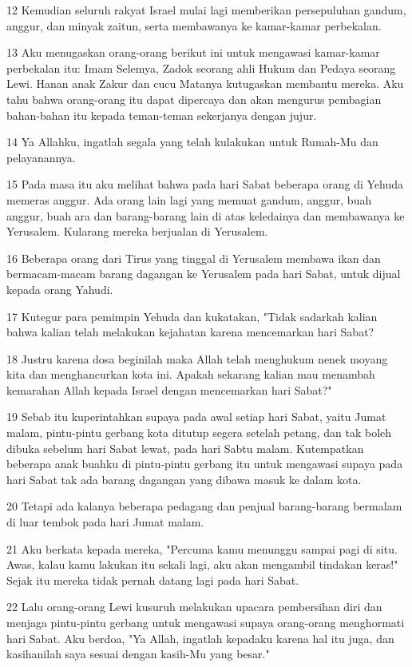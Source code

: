 \par 12 Kemudian seluruh rakyat Israel mulai lagi memberikan persepuluhan gandum, anggur, dan minyak zaitun, serta membawanya ke kamar-kamar perbekalan.
\par 13 Aku menugaskan orang-orang berikut ini untuk mengawasi kamar-kamar perbekalan itu: Imam Selemya, Zadok seorang ahli Hukum dan Pedaya seorang Lewi. Hanan anak Zakur dan cucu Matanya kutugaskan membantu mereka. Aku tahu bahwa orang-orang itu dapat dipercaya dan akan mengurus pembagian bahan-bahan itu kepada teman-teman sekerjanya dengan jujur.
\par 14 Ya Allahku, ingatlah segala yang telah kulakukan untuk Rumah-Mu dan pelayanannya.
\par 15 Pada masa itu aku melihat bahwa pada hari Sabat beberapa orang di Yehuda memeras anggur. Ada orang lain lagi yang memuat gandum, anggur, buah anggur, buah ara dan barang-barang lain di atas keledainya dan membawanya ke Yerusalem. Kularang mereka berjualan di Yerusalem.
\par 16 Beberapa orang dari Tirus yang tinggal di Yerusalem membawa ikan dan bermacam-macam barang dagangan ke Yerusalem pada hari Sabat, untuk dijual kepada orang Yahudi.
\par 17 Kutegur para pemimpin Yehuda dan kukatakan, "Tidak sadarkah kalian bahwa kalian telah melakukan kejahatan karena mencemarkan hari Sabat?
\par 18 Justru karena dosa beginilah maka Allah telah menghukum nenek moyang kita dan menghancurkan kota ini. Apakah sekarang kalian mau menambah kemarahan Allah kepada Israel dengan mencemarkan hari Sabat?"
\par 19 Sebab itu kuperintahkan supaya pada awal setiap hari Sabat, yaitu Jumat malam, pintu-pintu gerbang kota ditutup segera setelah petang, dan tak boleh dibuka sebelum hari Sabat lewat, pada hari Sabtu malam. Kutempatkan beberapa anak buahku di pintu-pintu gerbang itu untuk mengawasi supaya pada hari Sabat tak ada barang dagangan yang dibawa masuk ke dalam kota.
\par 20 Tetapi ada kalanya beberapa pedagang dan penjual barang-barang bermalam di luar tembok pada hari Jumat malam.
\par 21 Aku berkata kepada mereka, "Percuma kamu menunggu sampai pagi di situ. Awas, kalau kamu lakukan itu sekali lagi, aku akan mengambil tindakan keras!" Sejak itu mereka tidak pernah datang lagi pada hari Sabat.
\par 22 Lalu orang-orang Lewi kusuruh melakukan upacara pembersihan diri dan menjaga pintu-pintu gerbang untuk mengawasi supaya orang-orang menghormati hari Sabat. Aku berdoa, "Ya Allah, ingatlah kepadaku karena hal itu juga, dan kasihanilah saya sesuai dengan kasih-Mu yang besar."
